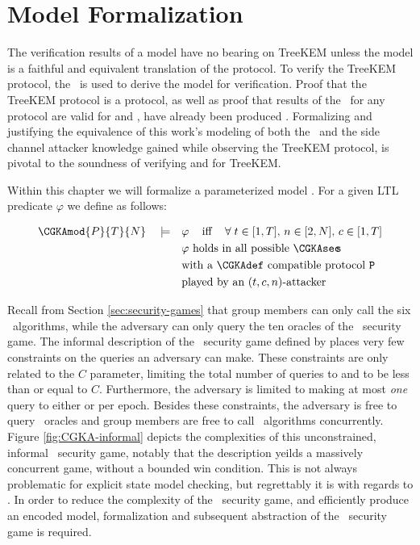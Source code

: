 \hypertarget{sec:model-formalization}{%
\chapter{Model Formalization}\label{sec:model-formalization}}

The verification results of a model have no bearing on TreeKEM unless the model is a faithful and equivalent translation of the protocol.
To verify the TreeKEM protocol, the \CGKAsec\ is used to derive the model for verification.
Proof that the TreeKEM protocol is a  protocol, as well as proof that results of the \CGKAsec\ for any  protocol are valid for  and , have already been produced \autocite{alwen2020security}.
Formalizing and justifying the equivalence of this work's modeling of both the \CGKAsec\ and the side channel attacker knowledge gained while observing the TreeKEM protocol, is pivotal to the soundness of verifying  and  for TreeKEM.\@

Within this chapter we will formalize a parameterized model .
For a given LTL predicate $\varphi$ we define  as follows:

\[
\begin{split}
\CGKAmod{P}{T}{N}\quad\models\quad& \varphi \;\;\;\textrm{ iff }\;\;\;\forall\; t \in [1, T],\, n \in [2, N],\, c \in [1, T]\\
  & \varphi \textrm{ holds in all possible \CGKAsec\!\!s}\\
  & \textrm{with a \CGKAdef\ compatible protocol } \mathtt{P}\\
  & \textrm{played by an } (t, c, n)\textrm{-attacker}
\end{split}
\]


Recall from Section \ref{sec:security-games} that group members can only call the six \CGKAdef\ algorithms, while the adversary can only query the ten oracles of the \CGKAsec\ security game.
The informal description of the \CGKAsec\ security game defined by \autocite{alwen2020security} places very few constraints on the queries an adversary can make.
These constraints are only related to the \(C\) parameter, limiting the total number of queries to  and  to be less than or equal to \(C\).
Furthermore, the adversary is limited to making at most \emph{one} query to either  or  per epoch.
Besides these constraints, the adversary is free to query \CGKAsec\ oracles and group members are free to call \CGKAdef\ algorithms concurrently.
Figure \ref{fig:CGKA-informal} depicts the complexities of this unconstrained, informal \CGKAsec\ security game, notably that the description yeilds a massively concurrent game, without a bounded win condition.
This is not always problematic for explicit state model checking, but regrettably it is with regards to \CGKAsec.
In order to reduce the complexity of the \CGKAsec\ security game, and efficiently produce an encoded model, formalization and subsequent abstraction of the \CGKAsec\ security game is required.

